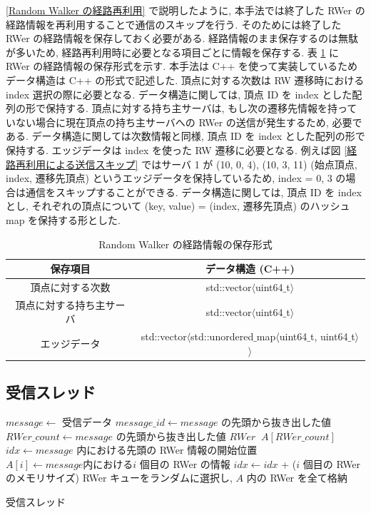 \ref{Random Walker の経路再利用} で説明したように, 本手法では終了した RWer の経路情報を再利用することで通信のスキップを行う. そのためには終了した RWer の経路情報を保存しておく必要がある. 経路情報のまま保存するのは無駄が多いため, 経路再利用時に必要となる項目ごとに情報を保存する. 表 \ref{Random Walker の経路情報の保存形式} に RWer の経路情報の保存形式を示す. 本手法は C++ を使って実装しているためデータ構造は C++ の形式で記述した. 頂点に対する次数は RW 遷移時における index 選択の際に必要となる. データ構造に関しては, 頂点 ID を index とした配列の形で保持する. 頂点に対する持ち主サーバは, もし次の遷移先情報を持っていない場合に現在頂点の持ち主サーバへの RWer の送信が発生するため, 必要である. データ構造に関しては次数情報と同様, 頂点 ID を index とした配列の形で保持する. エッジデータは index を使った RW 遷移に必要となる. 例えば図 \ref{経路再利用による送信スキップ} ではサーバ 1 が (10, 0, 4), (10, 3, 11) (始点頂点, index, 遷移先頂点) というエッジデータを保持しているため, index = 0, 3 の場合は通信をスキップすることができる. データ構造に関しては, 頂点 ID を index とし, それぞれの頂点について (key, value) = (index, 遷移先頂点) のハッシュ map を保持する形とした. 

\begin{table}[t]
    \caption{Random Walker の経路情報の保存形式}
    \label{Random Walker の経路情報の保存形式}
    \centering
    \begin{tabular}{cc}
        \hline
        保存項目  &  データ構造 (C++)  \\
        \hline \hline
        頂点に対する次数  &  std::vector$\langle$uint64$\_$t$\rangle$ \\
        \hline
        頂点に対する持ち主サーバ  &  std::vector$\langle$uint64$\_$t$\rangle$  \\
        \hline
        エッジデータ  &  std::vector$\langle$std::unordered$\_$map$\langle$uint64$\_$t, uint64$\_$t$\rangle$$\rangle$ \\
        \hline
    \end{tabular}
\end{table}

\subsection{受信スレッド}

\begin{algorithm}[t]
\DontPrintSemicolon
\nl $message \leftarrow$ 受信データ\;
\nl $message\_id \leftarrow message$ の先頭から抜き出した値\;
\nl {} {
\nl     $RWer\_count \leftarrow message$ の先頭から抜き出した値\;
\nl     $RWer \;\; A[RWer\_count]$\;
\nl     $idx \leftarrow message$ 内における先頭の RWer 情報の開始位置\;
\nl     {} {
\nl         $A[i] \leftarrow message 内における i$ 個目の RWer の情報\;
\nl         $idx \leftarrow idx$ + ($i$ 個目の RWer のメモリサイズ)\;}
\nl     RWer キューをランダムに選択し, $A$ 内の RWer を全て格納\;}
\nl {}
\caption{{受信スレッド} \label{受信スレッド}}
\end{algorithm}

